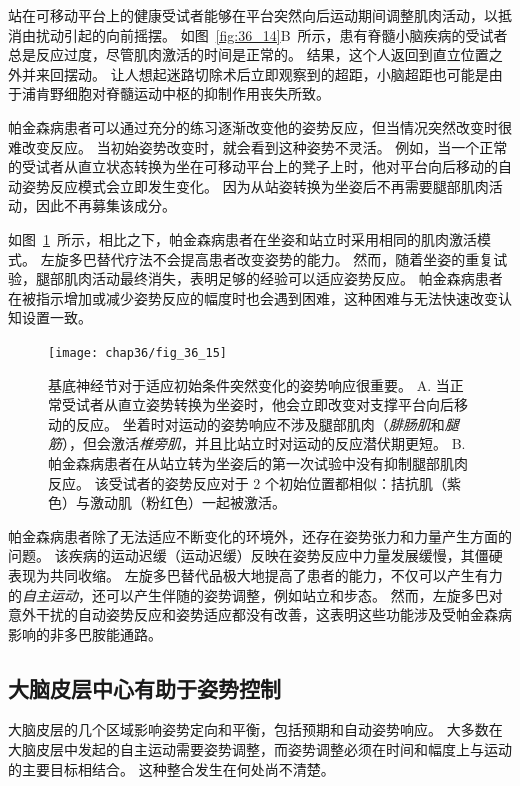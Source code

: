 站在可移动平台上的健康受试者能够在平台突然向后运动期间调整肌肉活动，以抵消由扰动引起的向前摇摆。
如图~\ref{fig:36_14}B~所示，患有脊髓小脑疾病的受试者总是反应过度，尽管肌肉激活的时间是正常的。
结果，这个人返回到直立位置之外并来回摆动。
让人想起迷路切除术后立即观察到的超距，小脑超距也可能是由于浦肯野细胞对脊髓运动中枢的抑制作用丧失所致。


帕金森病患者可以通过充分的练习逐渐改变他的姿势反应，但当情况突然改变时很难改变反应。
当初始姿势改变时，就会看到这种姿势不灵活。
例如，当一个正常的受试者从直立状态转换为坐在可移动平台上的凳子上时，他对平台向后移动的自动姿势反应模式会立即发生变化。
因为从站姿转换为坐姿后不再需要腿部肌肉活动，因此不再募集该成分。


如图~\ref{fig:36_15}~所示，相比之下，帕金森病患者在坐姿和站立时采用相同的肌肉激活模式。
左旋多巴替代疗法不会提高患者改变姿势的能力。
然而，随着坐姿的重复试验，腿部肌肉活动最终消失，表明足够的经验可以适应姿势反应。
帕金森病患者在被指示增加或减少姿势反应的幅度时也会遇到困难，这种困难与无法快速改变认知设置一致。


\begin{figure}[htbp]
	\centering
	\texttt{[image: chap36/fig\_36\_15]}
	\caption{基底神经节对于适应初始条件突然变化的姿势响应很重要\cite{horak1992postural}。
		A. 当正常受试者从直立姿势转换为坐姿时，他会立即改变对支撑平台向后移动的反应。
		坐着时对运动的姿势响应不涉及腿部肌肉（\textit{腓肠肌}和\textit{腿筋}），但会激活\textit{椎旁肌}，并且比站立时对运动的反应潜伏期更短。
		B. 帕金森病患者在从站立转为坐姿后的第一次试验中没有抑制腿部肌肉反应。
		该受试者的姿势反应对于 2 个初始位置都相似：拮抗肌（紫色）与激动肌（粉红色）一起被激活。}
	\label{fig:36_15}
\end{figure}


帕金森病患者除了无法适应不断变化的环境外，还存在姿势张力和力量产生方面的问题。
该疾病的运动迟缓（运动迟缓）反映在姿势反应中力量发展缓慢，其僵硬表现为共同收缩。
左旋多巴替代品极大地提高了患者的能力，不仅可以产生有力的\textit{自主运动}，还可以产生伴随的姿势调整，例如站立和步态。
然而，左旋多巴对意外干扰的自动姿势反应和姿势适应都没有改善，这表明这些功能涉及受帕金森病影响的非多巴胺能通路。



\subsection{大脑皮层中心有助于姿势控制}

大脑皮层的几个区域影响姿势定向和平衡，包括预期和自动姿势响应。
大多数在大脑皮层中发起的自主运动需要姿势调整，而姿势调整必须在时间和幅度上与运动的主要目标相结合。
这种整合发生在何处尚不清楚。



